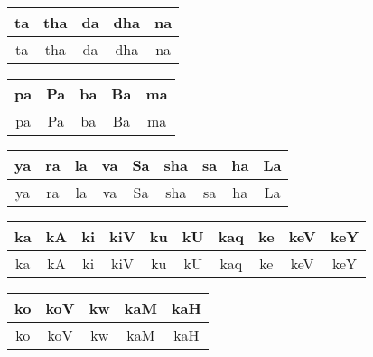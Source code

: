 \documentclass[12pt]{article}
\begin{document}
\bigskip
\begin{tabular}{|c|c|c|c|c|}
\hline
{\rm ta} & {\rm tha} & {\rm da} &  {\rm dha} & {\rm na}\\ 
\hline
ta & tha & da & dha & na\\
\hline
\end{tabular}

\bigskip
\begin{tabular}{|c|c|c|c|c|}
\hline
{\rm pa} & {\rm Pa} & {\rm ba} &  {\rm Ba} & {\rm ma}\\ 
\hline
pa & Pa & ba & Ba & ma\\
\hline
\end{tabular}

\bigskip
\begin{tabular}{|c|c|c|c|c|c|c|c|c|}
\hline
{\rm ya} & {\rm ra} & {\rm la} & {\rm va} & {\rm Sa} & {\rm sha} & {\rm sa} & {\rm
ha} & {\rm La}\\
\hline
ya & ra & la & va & Sa & sha & sa & ha & La\\
\hline
\end{tabular}

\bigskip
\begin{tabular}{|c|c|c|c|c|c|c|c|c|c|}
\hline
{\rm ka} & {\rm kA} & {\rm ki} & {\rm kiV} & {\rm ku} & {\rm kU} & {\rm kaq} & {\rm
ke} & {\rm keV} & {\rm keY} \\ 
\hline
ka & kA & ki & kiV & ku & kU & kaq & ke & keV & keY \\
\hline
\end{tabular}

\bigskip
\begin{tabular}{|c|c|c|c|c|}
\hline
{\rm ko} & {\rm koV} & {\rm kw} & {\rm kaM} &
{\rm kaH} \\
\hline
 ko & koV & kw & kaM &
kaH \\
\hline
\end{tabular}
\end{document}

